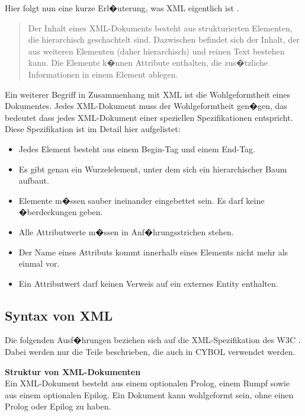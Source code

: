       Hier folgt nun eine kurze Erl�uterung, was XML eigentlich ist \cite[Seite 618]{defxml}.
      \begin{quotation}
        Der Inhalt eines XML-Dokuments besteht aus strukturierten Elementen,
        die hierarchisch geschachtelt sind. Dazwischen befindet sich der Inhalt,
        der aus weiteren Elementen (daher hierarchisch) und reinen Text bestehen kann.
        Die Elemente k�nnen Attribute enthalten, die zus�tzliche Informationen
        in einem Element ablegen.
      \end{quotation}
      Ein weiterer Begriff in Zusammenhang mit XML ist die Wohlgeformtheit eines Dokumentes. 
      Jedes XML-Dokument muss der Wohlgeformtheit gen�gen, das bedeutet dass jedes 
      XML-Dokument einer speziellen Spezifikationen entspricht.
      Diese Spezifikation ist im Detail hier aufgelistet:
      \begin{itemize}
        \item Jedes Element besteht aus einem Begin-Tag und einem End-Tag.
        \item Es gibt genau ein Wurzelelement, unter dem sich ein hierarchischer Baum aufbaut.
        \item Elemente m�ssen sauber ineinander eingebettet sein. Es darf 
              keine �berdeckungen geben.
        \item Alle Attributwerte m�ssen in Anf�hrungsstrichen stehen.
        \item Der Name eines Attributs kommt innerhalb eines Elements nicht mehr als einmal vor.
        \item Ein Attributwert darf keinen Verweis auf ein externes Entity enthalten.
      \end{itemize}
      
    \subsection{Syntax von XML}
    
      Die folgenden Ausf�hrungen beziehen sich auf die XML-Spezifikation des W3C \cite{w3c}.
      Dabei werden nur die Teile beschrieben, die auch in CYBOL verwendet werden. 

      \textbf{Struktur von XML-Dokumenten} \\
        Ein XML-Dokument besteht aus einem optionalen Prolog, einem Rumpf sowie aus einem
        optionalen Epilog. Ein Dokument kann wohlgeformt sein, ohne einen Prolog oder Epilog 
        zu haben. 
        
